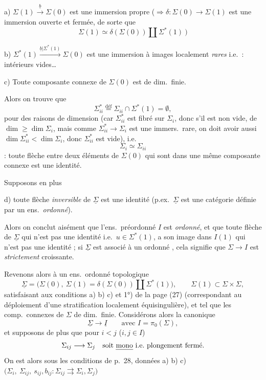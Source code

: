\documentclass[11pt,a4paper]{article}
\begin{document}
a) $\Sigma(1)\xrightarrow{\underline b}\Sigma(0)$ est une immersion propre ($\Rightarrow\delta : \Sigma(0)\to\Sigma(1)$ est une immersion ouverte et fermée, de sorte que 
\[
\Sigma(1)\simeq\delta(\Sigma(0))\amalg\Sigma^{*}(1)\ )
\]

b) $\Sigma^{*}(1)\xrightarrow{\underline b|\Sigma^{*}(1)}\Sigma(0)$ est une immersion à images localement \emph{rares} i.e.\ : intérieurs vides\ldots

c) Toute composante connexe de $\Sigma(0)$ est de dim.\ finie.

Alors on trouve que
\[
\Sigma^{*}_{ii}\overset{\text{déf}}{=}\Sigma_{ii}\cap\Sigma^{*}(1)=\emptyset ,
\]
pour des raisons de dimension (car $\Sigma^{*}_{ii}$ est fibré sur $\Sigma_i$, donc s'il est non vide, de $\dim\ge\dim\Sigma_i$, mais comme $\Sigma^{*}_{ii}\to\Sigma_i$ est une immers.\ rare, on doit avoir aussi $\dim\Sigma^{*}_{ii}<\dim\Sigma_i$, donc $\Sigma^{*}_{ii}$ est vide), i.e.
\[
\boxed{\Sigma_i\simeq\Sigma_{ii}}
\]
: toute flèche  entre deux  éléments de $\Sigma(0)$ qui sont dans une même composante connexe  est une identité.


Supposons en plus

d) toute flèche \emph{inversible} de $\underline{\Sigma}$ est une identité (p.ex.\ $\underline{\Sigma}$ est une catégorie définie par un ens.\ \emph{ordonné}).

Alors on conclut aisément que l'ens.\ préordonné $I$ est \emph{ordonné}, et que toute flèche de $\underline{\Sigma}$ qui n'est pas une identité i.e.\ $u\in\Sigma^{*}(1)$, a son image dans $I(1)$ qui n'est pas une identité ;  si $\underline{\Sigma}$ est associé à un   ordonné , cela signifie que $\Sigma\to I$ est \emph{strictement} croissante.

Revenons alors à un  ens.\ ordonné topologique
\[
\underline{\Sigma}=\bigl(\Sigma(0),\ \Sigma(1)=\delta(\Sigma(0))\amalg\Sigma^{*}(1)\bigr),\qquad \Sigma(1)\subset\Sigma\times\Sigma ,
\]
satisfaisant aux conditions a) b) c) et 1°)  de la page (27) (correspondant au déploiement d'une stratification localement équisingulière), et tel que les comp.\ connexes de $\Sigma$  \add{\ill{}} de dim.\ finie. Considérons alors la  \add{\ill{}} canonique
\[
\underline{\Sigma}\longrightarrow\underline I\qquad\text{avec } I=\pi_0(\Sigma),
\]
et supposons de plus que pour $i<j$ ($i,j\in I$)
\[
\Sigma_{ij}\longrightarrow\Sigma_j\quad\text{soit \emph{mono} i.e.\ plongement fermé.}
\]
On est alors sous les conditions de p.~28, données a) b) c) $\bigl(\Sigma_i,\ \Sigma_{ij},\ s_{ij},b_{ij} : \Sigma_{ij}\rightrightarrows\Sigma_i,\Sigma_j\bigr)$
\end{document}

